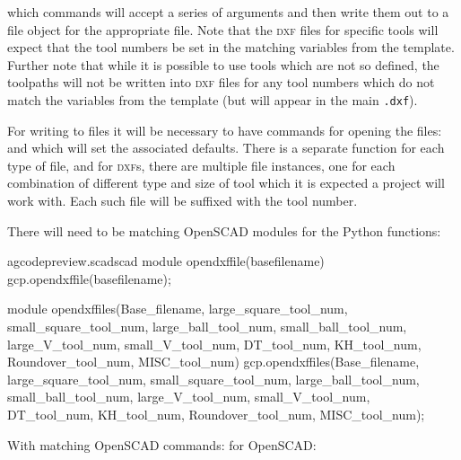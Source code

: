 \documentclass{ltxdoc}
\begin{document}
\noindent which commands will accept a series of arguments and then write them out to a file object for the appropriate file. Note that the \textsc{dxf} files for specific tools will expect that the tool numbers be set in the matching variables from the template. Further note that while it is possible to use tools which are not so defined, the toolpaths will not be written into \textsc{dxf} files for any tool numbers which do not match the variables from the template (but will appear in the main \verb|.dxf|).
 
For writing to files it will be necessary to have commands for opening the files:  and  which will set the associated defaults. There is a separate function for each type of file, and for \textsc{dxf}s, there are multiple file instances, one for each combination of different type and size of tool which it is expected a project will work with. Each such file will be suffixed with the tool number.

%
There will need to be matching OpenSCAD modules for the Python functions:

\lstset{firstnumber=\thegcpscad}
\begin{writecode}{a}{gcodepreview.scad}{scad}
module opendxffile(basefilename){
    gcp.opendxffile(basefilename);
}

module opendxffiles(Base_filename, large_square_tool_num, small_square_tool_num, large_ball_tool_num, small_ball_tool_num, large_V_tool_num, small_V_tool_num, DT_tool_num, KH_tool_num, Roundover_tool_num, MISC_tool_num) {
    gcp.opendxffiles(Base_filename, large_square_tool_num, small_square_tool_num, large_ball_tool_num, small_ball_tool_num, large_V_tool_num, small_V_tool_num, DT_tool_num, KH_tool_num, Roundover_tool_num, MISC_tool_num);
}

\end{writecode}
\addtocounter{gcpscad}{8}

With matching OpenSCAD commands:  for OpenSCAD:
\end{document}
